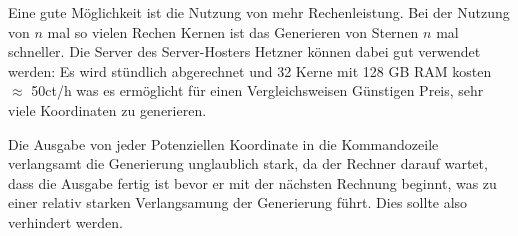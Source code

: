 Eine gute Möglichkeit ist die Nutzung von mehr Rechenleistung. Bei der Nutzung
von \( n \) mal so vielen Rechen Kernen ist das Generieren von Sternen \( n \)
mal schneller. Die Server des Server-Hosters Hetzner können dabei gut
verwendet werden: Es wird stündlich abgerechnet und 32 Kerne mit 128 GB RAM
kosten \( \approx \) 50ct/h was es ermöglicht für einen Vergleichsweisen
Günstigen Preis, sehr viele Koordinaten zu generieren.

Die Ausgabe von jeder Potenziellen Koordinate in die Kommandozeile verlangsamt
die Generierung unglaublich stark, da der Rechner darauf wartet, dass die Ausgabe
fertig ist bevor er mit der nächsten Rechnung beginnt, was zu einer relativ
starken Verlangsamung der Generierung führt. Dies sollte also verhindert werden.
